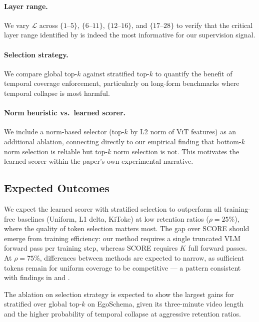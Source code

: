 \documentclass[12pt]{article}
\begin{document}
\paragraph{Layer range.}
We vary $\mathcal{L}$ across $\{1\text{--}5\}$, $\{6\text{--}11\}$,
$\{12\text{--}16\}$, and $\{17\text{--}28\}$ to verify that the
critical layer range identified by \textcite{gou2025empiricalstudyvideollmsanswer} is
indeed the most informative for our supervision signal.
 
\paragraph{Selection strategy.}
We compare global top-$k$ against stratified top-$k$ to quantify the
benefit of temporal coverage enforcement, particularly on long-form
benchmarks where temporal collapse is most harmful.
 
\paragraph{Norm heuristic vs.\ learned scorer.}
We include a norm-based selector (top-$k$ by L2 norm of ViT features)
as an additional ablation, connecting directly to our empirical finding
that bottom-$k$ norm selection is reliable but top-$k$ norm selection
is not. This motivates the learned scorer within the paper's own
experimental narrative.
 
\subsection{Expected Outcomes}
 
We expect the learned scorer with stratified selection to outperform
all training-free baselines (Uniform, L1 delta, KiToke) at low
retention ratios ($\rho = 25\%$), where the quality of token selection
matters most. The gap over SCORE should emerge from training
efficiency: our method requires a single truncated VLM forward pass per
training step, whereas SCORE requires $K$ full forward passes. At
$\rho = 75\%$, differences between methods are expected to narrow, as
sufficient tokens remain for uniform coverage to be competitive --- a
pattern consistent with findings in \textcite{steunou2026peek} and
\textcite{learnpruner2026}.
 
The ablation on selection strategy is expected to show the largest
gains for stratified over global top-$k$ on EgoSchema, given its
three-minute video length and the higher probability of temporal
collapse at aggressive retention ratios.

\printbibliography
\end{document}
